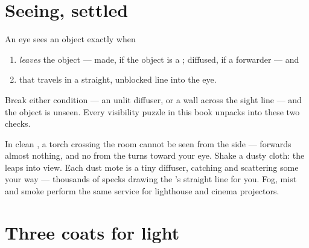 \section{Seeing, settled}

\begin{proposition}\label{prop:g7:light-sources-propagation:vision}
An eye sees an object exactly when
\begin{enumerate}
  \item {} \emph{leaves} the object --- made, if the object is
        a ; diffused, if a forwarder --- and
  \item that  travels in a straight, unblocked line into
        the eye.
\end{enumerate}
Break either condition --- an unlit diffuser, or a wall across
the sight line --- and the object is unseen. Every visibility
puzzle in this book unpacks into these two checks.
\end{proposition}

\begin{example}\label{ex:g7:light-sources-propagation:beam}
In clean , a torch  crossing the room cannot be seen from
the side ---  forwards almost nothing, and no  from the
 turns toward your eye. Shake a dusty cloth: the  leaps
into view. Each dust mote is a tiny diffuser, catching 
and scattering some your way --- thousands of specks drawing the
's straight line for you. Fog, mist and smoke perform the
same service for lighthouse  and cinema projectors.
\end{example}

\section{Three coats for light}

